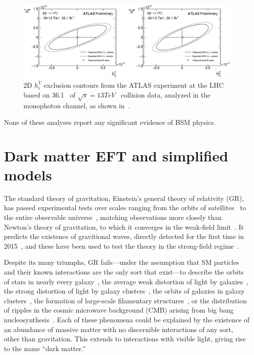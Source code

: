 \documentclass[oneside, letterpaper, 12pt, oldfontcommands]{memoir}
\begin{document}
\begin{figure}[hbtp]
  \begin{center}
    \includegraphics[width=\textwidth]{Figures/atlas_atgc_13tev_2dlimits.png}
    \caption{
      2D $h_{i}^{V}$ exclusion contours from the ATLAS experiment at the LHC based on 36.1 \fbinv\ of $\sqrt{s} = 13\unit{TeV}$
      \Pp\Pp\ collision data, analyzed in the monophoton channel, as shown in~\cite{ref:CERN-EP-2018-220}.
    }
    \label{fig:atlas_atgc_13tev_2dlimits}
  \end{center}
\end{figure}

None of these analyses report any significant evidence of BSM physics.

\section{Dark matter EFT and simplified models} \label{sec:introduction_dm}
The standard theory of gravitation, Einstein's
general theory of relativity (GR), has passed experimental tests over scales ranging from the orbits of satellites~\cite{ref:lrr-2003-1} to the entire observable universe~\cite{ref:planck2018_cosparams},
matching observations more closely than Newton's theory of gravitation, to which it converges in the weak-field limit~\cite{ref:WaldGR}.
It predicts the existence of gravitional waves, directly detected for the first time in 2015~\cite{ref:PhysRevLett.116.061102}, and these have been used to test the theory in the strong-field regime~\cite{ref:PhysRevLett.116.221101}.

Despite its many triumphs, GR fails---under the assumption that SM particles and their known interactions are the only sort that exist---to describe the orbits of stars in nearly every galaxy~\cite{ref:nature25767},
the average weak distortion of light by galaxies~\cite{ref:weaklensing}, the strong distortion of light by galaxy clusters~\cite{ref:mnras/stw3385}, the orbits of galaxies in galaxy clusters~\cite{ref:annurev-astro-081710-102514},
the formation of large-scale filamentary structures~\cite{ref:nature03597}, or the distribution of ripples in the cosmic microwave background (CMB) arising from big bang nucleosynthesis~\cite{ref:planck2018_cosparams}.
Each of these phenomena could be explained by the existence of an abundance of massive matter with no discernible interactions of any sort, other than gravitation.
This extends to interactions with visible light, giving rise to the name ``dark matter.''
\end{document}
